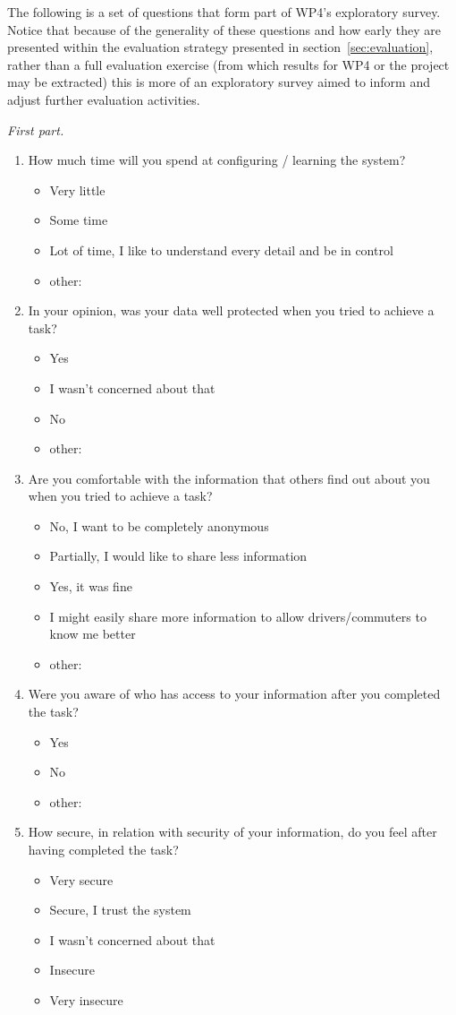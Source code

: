 The following is a set of questions that form part of WP4's exploratory survey. Notice that because of the generality of these questions and how early they are presented within the evaluation strategy presented in section~\ref{sec:evaluation}, rather than a full evaluation exercise (from which results for WP4 or the project may be extracted) this is more of an exploratory survey aimed to inform and adjust further evaluation activities.

\emph{First part.}

\begin{enumerate}
\item How much time will you spend at configuring / learning the system? 
	\begin{itemize}
	\item Very little
	\item Some time
	\item Lot of time, I like to understand every detail and be in control
	\item other: 
	\end{itemize}
\item In your opinion, was your data well protected when you tried to achieve a task? 
	\begin{itemize}
	\item Yes
	\item I wasn't concerned about that
	\item No
	\item other:
	\end{itemize}
\item Are you comfortable with the information that others find out about you when you tried to achieve a task? 
	\begin{itemize}
	\item No, I want to be completely anonymous
	\item Partially, I would like to share less information
	\item Yes, it was fine
	\item I might easily share more information to allow drivers/commuters to know me better
	\item other:
	\end{itemize}
\item Were you aware of who has access to your information after you completed the task?
	\begin{itemize}
	\item Yes
	\item No
	\item other:
	\end{itemize}
\item How secure, in relation with security of your information, do you feel after having completed the task? 
	\begin{itemize}
	\item Very secure
	\item Secure, I trust the system
	\item I wasn't concerned about that
	\item Insecure
	\item Very insecure 
	\end{itemize}
\end{enumerate}
	

